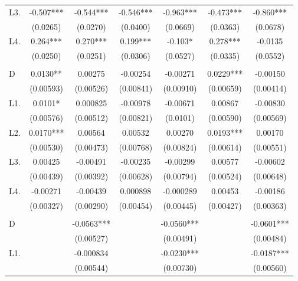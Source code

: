 \documentclass[
  manuscript=article,
  layout=publish,
  year=2026,
  volume=3,
]{den}
\begin{document}
\begin{longtable}{l*{6}{c}}
L3.
& -0.507*** & -0.544***
& -0.546*** & -0.963***
& -0.473*** & -0.860*** \\
& (0.0265)  & (0.0270)
& (0.0400)  & (0.0669)
& (0.0363)  & (0.0678) \\

L4.
& 0.264***  & 0.270***
& 0.199***  & -0.103*
& 0.278***  & -0.0135 \\
& (0.0250)  & (0.0251)
& (0.0306)  & (0.0527)
& (0.0335)  & (0.0552) \\

\addlinespace[4pt]
\multicolumn{7}{l}{Lagged $\Delta \ln(\text{ntl})$}\\
D
& 0.0130** & 0.00275
& -0.00254 & -0.00271
& 0.0229***& -0.00150 \\
& (0.00593)& (0.00526)
& (0.00841)& (0.00910)
& (0.00659)& (0.00414) \\

L1.
& 0.0101*  & 0.000825
& -0.00978 & -0.00671
& 0.00867  & -0.00830 \\
& (0.00576)& (0.00512)
& (0.00821)& (0.0101)
& (0.00590)& (0.00569) \\

L2.
& 0.0170***& 0.00564
& 0.00532  & 0.00270
& 0.0193***& 0.00170 \\
& (0.00530)& (0.00473)
& (0.00768)& (0.00824)
& (0.00614)& (0.00551) \\

L3.
& 0.00425  & -0.00491
& -0.00235 & -0.00299
& 0.00577  & -0.00602 \\
& (0.00439)& (0.00392)
& (0.00628)& (0.00794)
& (0.00524)& (0.00648) \\

L4.
& -0.00271 & -0.00439
& 0.000898 & -0.000289
& 0.00453  & -0.00186 \\
& (0.00327)& (0.00290)
& (0.00454)& (0.00445)
& (0.00427)& (0.00363) \\

\addlinespace[4pt]
\multicolumn{7}{l}{Scarring dynamics (only for +Scarring models)}\\
D
&          & -0.0563***
&          & -0.0560***
&          & -0.0601*** \\
&          & (0.00527)
&          & (0.00491)
&          & (0.00484) \\

L1.
&          & -0.000834
&          & -0.0230***
&          & -0.0187*** \\
&          & (0.00544)
&          & (0.00730)
&          & (0.00560) \\


\end{longtable}
\end{document}
